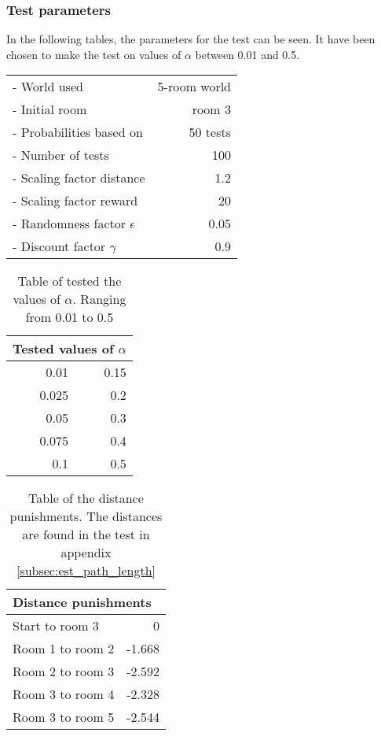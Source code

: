 \documentclass[../Head/Main.tex]{subfiles}
\begin{document}
\subsubsection{Test parameters}
In the following tables, the parameters for the test can be seen. It have been chosen to make the test on values of $\alpha$ between 0.01 and 0.5.\\
\begin{minipage}[c]{0.35\textwidth}
	\begin{tabular}{l r}
	- World used                   & 5-room world\\
	- Initial room                 & room 3\\	
	- Probabilities based on       & 50 tests\\	
	- Number of tests              & 100\\
	- Scaling factor distance      & 1.2\\
	- Scaling factor reward        & 20\\
	- Randomness factor $\epsilon$ & 0.05\\
	- Discount factor $\gamma$     & 0.9\\
	\end{tabular}
\end{minipage}	
\hfill
\begin{minipage}[c]{0.2\textwidth}
	\begin{table}[H]
		\centering
		\begin{tabular}{r r}
		\hline
		\multicolumn{2}{l}{\textbf{Tested values of $\alpha$}}\\ 			\hline
		0.01   & 0.15\\
		0.025  & 0.2\\
		0.05   & 0.3\\
		0.075  & 0.4\\
		0.1    & 0.5\\
		\hline
		\end{tabular}
		\caption{Table of tested the values of $\alpha$. Ranging from 0.01 to 0.5}
		\label{tab:test_alpha}
	\end{table}
\end{minipage}
\hfill
\begin{minipage}[c]{0.3\textwidth}
	\begin{table}[H]
	\centering
	\begin{tabular}{l r}
		\hline
		\multicolumn{2}{l}{\textbf{Distance punishments}}\\ 			\hline
		Start to room 3   & 0\\
		Room 1 to room 2  & -1.668\\
		Room 2 to room 3  & -2.592\\
		Room 3 to room 4  & -2.328\\
		Room 3 to room 5  & -2.544\\
		\hline
	\end{tabular}
	\caption{Table of the distance punishments. The distances are found in the test in appendix \ref{subsec:est_path_length}}
	\label{tab:distance_punishment_5_rooms_1}
\end{table}
\end{minipage}
\end{document}
